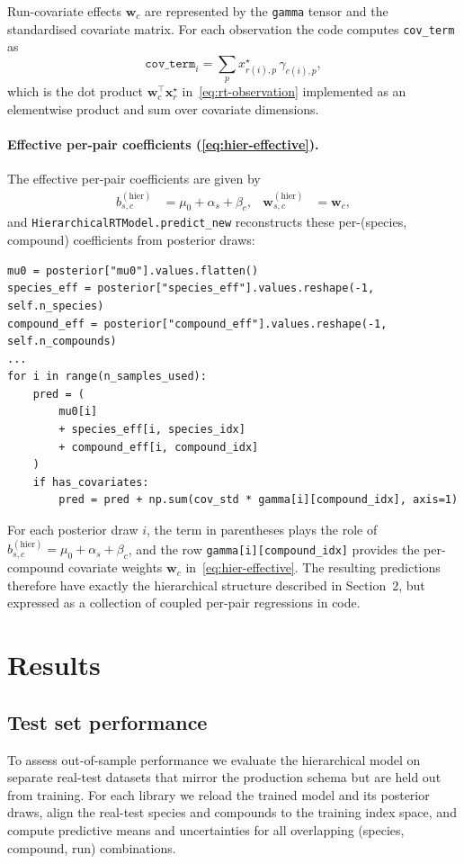 \documentclass[11pt]{article}
\begin{document}
Run-covariate effects $\bm{w}_c$ are represented by the \texttt{gamma} tensor and
the standardised covariate matrix. For each observation the code computes
\texttt{cov\_term} as
\[
  \texttt{cov\_term}_i
  =
  \sum_{p}
    x^{\star}_{r(i),p}\,
    \gamma_{c(i),p},
\]
which is the dot product $\bm{w}_c^{\top}\bm{x}^{\star}_r$ in~\eqref{eq:rt-observation}
implemented as an elementwise product and sum over covariate dimensions.

\paragraph{Effective per-pair coefficients \texorpdfstring{(\eqref{eq:hier-effective})}{(2.4)}.}
The effective per-pair coefficients are given by
\begin{align*}
  b^{(\mathrm{hier})}_{s,c}
  &=
  \mu_0+\alpha_s+\beta_c,
  &
  \bm{w}^{(\mathrm{hier})}_{s,c}
  &=
  \bm{w}_c,
\end{align*}
and \texttt{HierarchicalRTModel.predict\_new} reconstructs these per-(species, compound)
coefficients from posterior draws:
\begin{verbatim}
mu0 = posterior["mu0"].values.flatten()
species_eff = posterior["species_eff"].values.reshape(-1, self.n_species)
compound_eff = posterior["compound_eff"].values.reshape(-1, self.n_compounds)
...
for i in range(n_samples_used):
    pred = (
        mu0[i]
        + species_eff[i, species_idx]
        + compound_eff[i, compound_idx]
    )
    if has_covariates:
        pred = pred + np.sum(cov_std * gamma[i][compound_idx], axis=1)
\end{verbatim}
For each posterior draw $i$, the term in parentheses plays the role of
$b^{(\mathrm{hier})}_{s,c}=\mu_0+\alpha_s+\beta_c$, and the row
\texttt{gamma[i][compound\_idx]} provides the per-compound covariate weights
$\bm{w}_c$ in~\eqref{eq:hier-effective}. The resulting predictions therefore have
exactly the hierarchical structure described in Section~2, but expressed as a
collection of coupled per-pair regressions in code.

\section{Results}

\subsection{Test set performance}

To assess out-of-sample performance we evaluate the hierarchical model on separate
real-test datasets that mirror the production schema but are held out from training.
For each library we reload the trained model and its posterior draws, align the
real-test species and compounds to the training index space, and compute predictive
means and uncertainties for all overlapping (species, compound, run) combinations.
\end{document}
